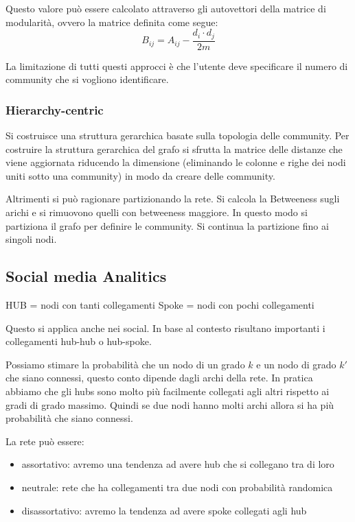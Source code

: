 Questo valore può essere calcolato attraverso gli autovettori della matrice di 
modularità, ovvero la matrice definita come segue:
\begin{equation}
    B_{ij} = A_{ij} - \frac{d_i \cdot d_j}{2m}
\end{equation}
\begin{nota}
    La limitazione di tutti questi approcci è che l'utente deve specificare il 
    numero di community che si vogliono identificare.
\end{nota}
\subsubsection{Hierarchy-centric}

Si costruisce una struttura gerarchica basate sulla topologia delle community.
Per costruire la struttura gerarchica del grafo si sfrutta la matrice delle distanze 
che viene aggiornata riducendo la dimensione (eliminando le colonne e righe dei nodi
uniti sotto una community) in modo da creare delle community. 


Altrimenti si può ragionare partizionando la rete. Si calcola la Betweeness sugli 
arichi e si rimuovono quelli con betweeness maggiore. In questo modo si partiziona
il grafo per definire le community. Si continua la partizione fino ai singoli nodi.

\subsection{Social media Analitics}
HUB = nodi con tanti collegamenti
Spoke = nodi con pochi collegamenti

Questo si applica anche nei social. In base al contesto risultano importanti i
collegamenti hub-hub o hub-spoke.

Possiamo stimare la probabilità che un nodo di un grado $k$ e un nodo di grado $k'$
che siano connessi, questo conto dipende dagli archi della rete. In pratica abbiamo
che gli hubs sono molto più facilmente collegati agli altri rispetto ai gradi di grado massimo.
Quindi se due nodi hanno molti archi allora si ha più probabilità che siano connessi.


La rete può essere:
\begin{itemize}
    \item assortativo: avremo una tendenza ad avere hub che si collegano tra di loro
    \item neutrale: rete che ha collegamenti tra due nodi con probabilità randomica
    \item disassortativo: avremo la tendenza ad avere spoke collegati agli hub
\end{itemize}

